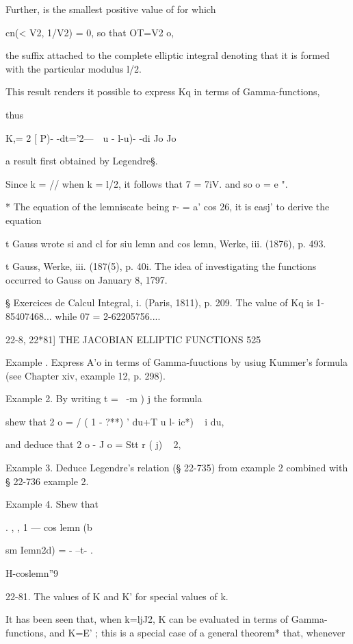 Further, is the smallest positive value of for which

cn(< V2, 1/V2) = 0, so that OT=V2 o,

the suffix attached to the complete elliptic integral denoting that it
is formed with the particular modulus l/\/2.

This result renders it possible to express Kq in terms of
Gamma-functions,

thus

K,= 2 [ P)- -dt='2---\ \ u - l-u)- -di Jo Jo

a result first obtained by Legendre§.

Since k = // when k = l/\/2, it follows that 7 = 7iV. and so o = e ".

* The equation of the lemniscate being r- = a' cos 26, it is easj' to
derive the equation


t Gauss wrote si and cl for siu lemn and cos lemn, Werke, iii. (1876),
p. 493.

t Gauss, Werke, iii. (187(5), p. 40i. The idea of investigating the
functions occurred to Gauss on January 8, 1797.

§ Exercices de Calcul Integral, i. (Paris, 1811), p. 209. The value of
Kq is 1-85407468... while 07 = 2-62205756....

22-8, 22*81] THE JACOBIAN ELLIPTIC FUNCTIONS 525

Example . Express A'o in terms of Gamma-fuuctions by usiug Kummer's
formula (see Chapter xiv, example 12, p. 298).

Example 2. By writing t = \ -m ) j the formula

shew that 2 o = / ( 1 - ?**) ' du+T u l- ic*) ~ i du,

and deduce that 2 o - J o = Stt r ( j) ~ 2,

Example 3. Deduce Legendre's relation (§ 22-735) from example 2
combined with § 22-736 example 2.

Example 4. Shew that

. , , 1 — cos lemn (b

sm Iemn2d) = - --t- .

H-coslemn''9

22-81. The values of K and K' for special values of k.

It has been seen that, when k=ljJ2, K can be evaluated in terms of
Gamma-functions, and K=E' ; this is a special case of a general
theorem* that, whenever

